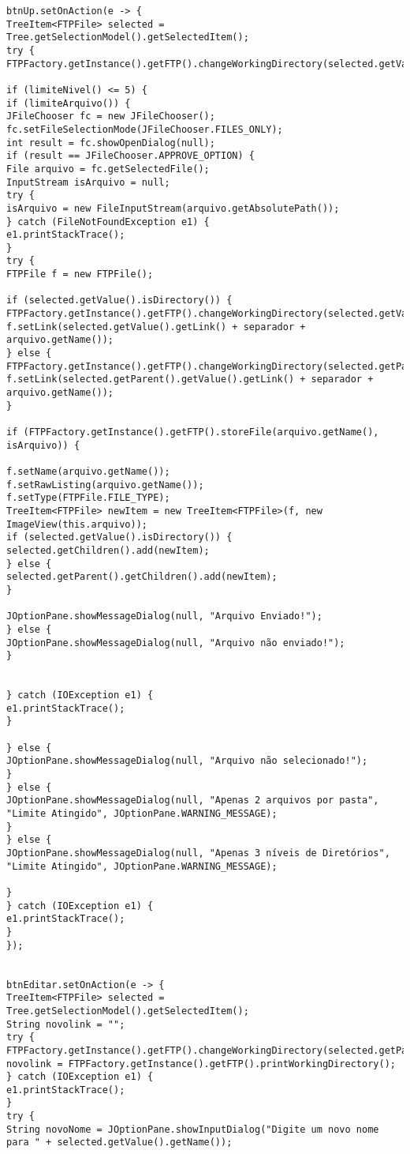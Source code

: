 \documentclass[12pt]{article}
\begin{document}
\begin{lstlisting}
btnUp.setOnAction(e -> {
TreeItem<FTPFile> selected = Tree.getSelectionModel().getSelectedItem();
try {
FTPFactory.getInstance().getFTP().changeWorkingDirectory(selected.getValue().getLink());

if (limiteNivel() <= 5) {
if (limiteArquivo()) {
JFileChooser fc = new JFileChooser();
fc.setFileSelectionMode(JFileChooser.FILES_ONLY);
int result = fc.showOpenDialog(null);
if (result == JFileChooser.APPROVE_OPTION) {
File arquivo = fc.getSelectedFile();
InputStream isArquivo = null;
try {
isArquivo = new FileInputStream(arquivo.getAbsolutePath());
} catch (FileNotFoundException e1) {
e1.printStackTrace();
}
try {
FTPFile f = new FTPFile();

if (selected.getValue().isDirectory()) {
FTPFactory.getInstance().getFTP().changeWorkingDirectory(selected.getValue().getLink());
f.setLink(selected.getValue().getLink() + separador + arquivo.getName());
} else {
FTPFactory.getInstance().getFTP().changeWorkingDirectory(selected.getParent().getValue().getLink());
f.setLink(selected.getParent().getValue().getLink() + separador + arquivo.getName());
}

if (FTPFactory.getInstance().getFTP().storeFile(arquivo.getName(), isArquivo)) {

f.setName(arquivo.getName());
f.setRawListing(arquivo.getName());
f.setType(FTPFile.FILE_TYPE);
TreeItem<FTPFile> newItem = new TreeItem<FTPFile>(f, new ImageView(this.arquivo));
if (selected.getValue().isDirectory()) {
selected.getChildren().add(newItem);
} else {
selected.getParent().getChildren().add(newItem);
}

JOptionPane.showMessageDialog(null, "Arquivo Enviado!");
} else {
JOptionPane.showMessageDialog(null, "Arquivo não enviado!");
}


} catch (IOException e1) {
e1.printStackTrace();
}

} else {
JOptionPane.showMessageDialog(null, "Arquivo não selecionado!");
}
} else {
JOptionPane.showMessageDialog(null, "Apenas 2 arquivos por pasta", "Limite Atingido", JOptionPane.WARNING_MESSAGE);
}
} else {
JOptionPane.showMessageDialog(null, "Apenas 3 níveis de Diretórios", "Limite Atingido", JOptionPane.WARNING_MESSAGE);

}
} catch (IOException e1) {
e1.printStackTrace();
}
});


btnEditar.setOnAction(e -> {
TreeItem<FTPFile> selected = Tree.getSelectionModel().getSelectedItem();
String novolink = "";
try {
FTPFactory.getInstance().getFTP().changeWorkingDirectory(selected.getParent().getValue().getLink());
novolink = FTPFactory.getInstance().getFTP().printWorkingDirectory();
} catch (IOException e1) {
e1.printStackTrace();
}
try {
String novoNome = JOptionPane.showInputDialog("Digite um novo nome para " + selected.getValue().getName());


\end{lstlisting}
\end{document}
